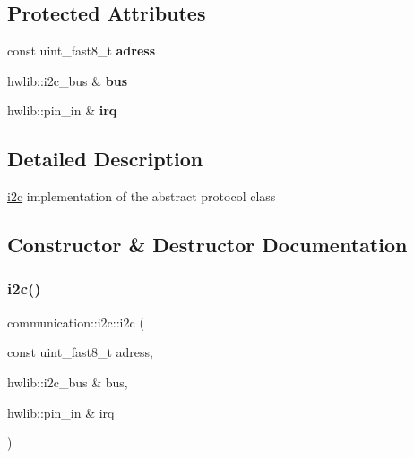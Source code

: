 \subsection*{Protected Attributes}
\begin{DoxyCompactItemize}
\item 
\mbox{\label{classcommunication_1_1i2c_ae52172877163dd81dd4f403af2cab4da}} 
const uint\+\_\+fast8\+\_\+t {\bfseries adress}
\item 
\mbox{\label{classcommunication_1_1i2c_ad13076f35c929f3e5b7d6e7a4a6b98ac}} 
hwlib\+::i2c\+\_\+bus \& {\bfseries bus}
\item 
\mbox{\label{classcommunication_1_1i2c_a18f6d07d153f07337b7368c4aba36a41}} 
hwlib\+::pin\+\_\+in \& {\bfseries irq}
\end{DoxyCompactItemize}


\subsection{Detailed Description}
\hyperlink{classcommunication_1_1i2c}{i2c} implementation of the abstract protocol class 

\subsection{Constructor \& Destructor Documentation}
\mbox{\label{classcommunication_1_1i2c_a87bea8199d070f323db519bc061b2944}} 
\subsubsection{\texorpdfstring{i2c()}{i2c()}}
{\footnotesize\ttfamily communication\+::i2c\+::i2c (\begin{DoxyParamCaption}\item[{const uint\+\_\+fast8\+\_\+t}]{adress,  }\item[{hwlib\+::i2c\+\_\+bus \&}]{bus,  }\item[{hwlib\+::pin\+\_\+in \&}]{irq }\end{DoxyParamCaption})}



